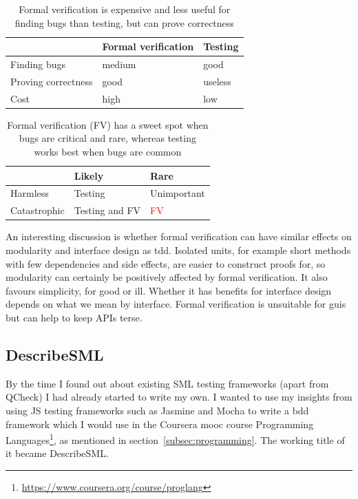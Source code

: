 \documentclass[11pt]{article}
\begin{document}
\begin{table}
  \centering
    \begin{tabular}{ l | l l}
    & Formal verification & Testing \\ \hline
    Finding bugs & medium & good \\
    Proving correctness & good & useless \\
    Cost & high & low \\
    \end{tabular}
  \caption{Formal verification is expensive and less useful for finding bugs than testing, but can prove correctness}
  \label{tab:fvt}
\end{table}

\begin{table}
  \centering
    \begin{tabular}{ l | l l}
    & Likely & Rare \\ \hline
    Harmless & Testing & Unimportant \\
    Catastrophic & Testing and FV & \textcolor{red}{FV} \\
    \end{tabular}
  \caption{Formal verification (FV) has a sweet spot when bugs are critical and rare, whereas testing works best when bugs are common}
  \label{tab:fvt2}
\end{table}

An interesting discussion is whether formal verification can have similar effects on modularity and interface design as \gls{tdd}. Isolated units, for example short methods with few dependencies and side effects, are easier to construct proofs for, so modularity can certainly be positively affected by formal verification. It also favours simplicity, for good or ill. Whether it has benefits for interface design depends on what we mean by interface. Formal verification is unsuitable for \glspl{gui} but can help to keep APIs terse.


\subsection{DescribeSML}
\label{subsec:describesml}

By the time I found out about existing SML testing frameworks (apart from QCheck) I had already started to write my own. I wanted to use my insights from using JS testing frameworks such as Jasmine and Mocha to write a \gls{bdd} framework which I would use in the Coursera \gls{mooc} course Programming Languages\footnote{\url{https://www.coursera.org/course/proglang}}, as mentioned in section~\ref{subsec:programming}. The working title of it became DescribeSML.
\end{document}

